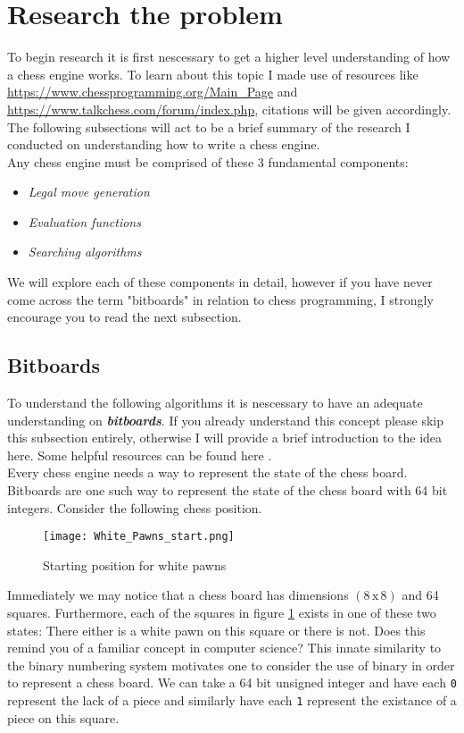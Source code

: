 \section{Research the problem}
To begin research it is first nescessary to get a higher level understanding
of how a chess engine works. To learn about this topic
I made use of resources like \url{https://www.chessprogramming.org/Main_Page}
and \url{https://www.talkchess.com/forum/index.php}, citations will be 
given accordingly. The following subsections will act to be 
a brief summary of the research I conducted on understanding
how to write a chess engine.\\

Any chess engine must be comprised of these 3 fundamental components:
\begin{itemize}
  \item \textit{Legal move generation}
  \item \textit{Evaluation functions}
  \item \textit{Searching algorithms}\\
\end{itemize}

We will explore each of these components in detail, however 
if you have never come across the term "bitboards" in 
relation to chess programming, I strongly 
encourage you to read the next subsection.

\subsection*{Bitboards}
To understand the following algorithms it is nescessary to 
have an adequate understanding on \textbf{\textit{bitboards}}.
If you already understand this concept please skip this 
subsection entirely, otherwise I will provide a brief 
introduction to the idea here. Some helpful resources can be
found here \cite{bitboards}.\\

Every chess engine needs a way to represent the state of the
chess board. Bitboards are one such way to represent the
state of the chess board with 64 bit integers. Consider
the following chess position.

\begin{figure}[h]
  \texttt{[image: White\_Pawns\_start.png]}
  \centering
  \caption{Starting position for white pawns}
  \label{whitepawns}
\end{figure}

Immediately we may notice that a chess board has dimensions
$(8 \, \textrm{x} \, 8)$ and 64 squares. Furthermore, 
each of the squares in figure \ref{whitepawns} exists 
in one of these two states: There either is a white pawn on
this square or there is not. Does this remind you of a 
familiar concept in computer science? This innate similarity to 
the binary numbering system motivates one to consider the 
use of binary in order to represent a chess board. We can take a 
64 bit unsigned integer and have each \texttt{0} 
represent the lack of a piece and similarly 
have each \texttt{1} represent the existance of a piece on 
this square.\\

